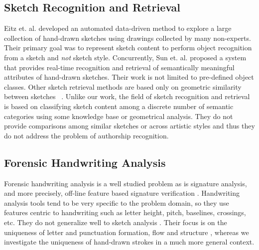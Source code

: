 \subsection{Sketch Recognition and Retrieval}
\vspace{-2mm}
Eitz et. al.  developed an automated data-driven method to explore a large collection of hand-drawn sketches using drawings collected by many non-experts. Their primary goal was to represent sketch content to perform object recognition from a sketch and \emph{not} sketch style. Concurrently, Sun et. al. \cite{Sun:2012:SAH:2393347.2396429} proposed a system that provides real-time recognition and retrieval of semantically meaningful attributes of hand-drawn sketches. Their work is not limited to pre-defined object classes. Other sketch retrieval methods are based only on geometric similarity between sketches ~\cite{Shrivastava:2011:DVS:2024156.2024188,5674030}. Unlike our work, the field of sketch recognition and retrieval is based on classifying sketch content among a discrete number of semantic categories using some knowledge base or geometrical analysis. They do not provide comparisons among similar sketches or across artistic styles and thus they do not address the problem of authorship recognition.

\vspace{-2mm}
\subsection{Forensic Handwriting Analysis}
\vspace{-2mm}
Forensic handwriting analysis is a well studied problem \cite{srisurvey03} as is signature analysis, and more precisely, off-line feature based signature verification \cite{4603099,Kovari2013247}. Handwriting analysis tools tend to be very specific to the problem domain, so they use features centric to handwriting such as letter height, pitch, baselines, crossings, etc. They do not generalize well to sketch analysis \cite{1263248}. Their focus is on the uniqueness of letter and punctuation formation, flow and structure \cite{handwriting2001}, whereas we investigate the uniqueness of hand-drawn strokes in a much more general context.

